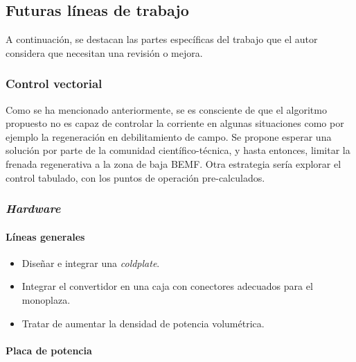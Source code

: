\subsection{Futuras líneas de trabajo}

A continuación, se destacan las partes específicas del trabajo que el autor considera que necesitan una revisión o mejora.

\subsubsection{Control vectorial}

Como se ha mencionado anteriormente, se es consciente de que el algoritmo propuesto no es capaz de controlar la corriente en algunas situaciones como por ejemplo la regeneración en debilitamiento de campo. Se propone esperar una solución por parte de la comunidad científico-técnica, y hasta entonces, limitar la frenada regenerativa a la zona de baja BEMF. Otra estrategia sería explorar el control tabulado, con los puntos de operación pre-calculados.

\subsubsection{\textit{Hardware}}

\paragraph{Líneas generales}
\begin{itemize}
	\item Diseñar e integrar una \textit{coldplate}.
	\item Integrar el convertidor en una caja con conectores adecuados para el monoplaza.
	\item Tratar de aumentar la densidad de potencia volumétrica.
\end{itemize}
\paragraph{Placa de potencia}


